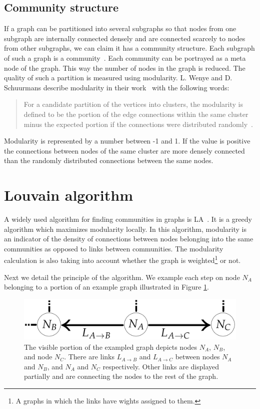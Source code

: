\subsection{Community structure} \label{communityStructure}
If a graph can be partitioned into several subgraphs so that nodes from one subgraph are internally connected densely and are connected scarcely to nodes from other subgraphs, we can claim it has a community structure. Each subgraph of such a graph is a community~\cite{communitiesOverview}. Each community can be portrayed as a meta node of the graph. This way the number of nodes in the graph is reduced. The quality of such a partition is measured using modularity. L. Wenye and D. Schuurmans describe modularity in their work~\cite{modularityOverview} with the following words: \begin{quotation}  For a candidate partition of the vertices into clusters, the modularity is defined to be the portion of the edge connections within the same cluster minus the expected portion if the connections were distributed randomly~\cite{modularityDefinition}. \end{quotation} Modularity is represented by a number between -1 and 1. If the value is positive the connections between nodes of the same cluster are more densely connected than the randomly distributed connections between the same nodes.

\section{Louvain algorithm} \label{louvainAlgorithm}
A widely used algorithm for finding communities in graphs is LA~\cite{louvainAlgorithm}. It is a greedy algorithm which maximizes modularity locally. In this algorithm, modularity is an indicator of the density of connections between nodes belonging into the same communities as opposed to links between communities. The modularity calculation is also taking into account whether the graph is weighted\footnote{A graphs in which the links have wights assigned to them.} or not.

Next we detail the principle of the algorithm. We example each step on node $N_{A}$ belonging to a portion of an example graph illustrated in Figure \ref{exampleGraphLouvain}.
\begin{figure}[ht!]
  \centering
  \includegraphics[width=\textwidth]{Images/graphForCommunity.png}
  \caption{The visible portion of the exampled graph depicts nodes $N_{A}$, $N_{B}$, and  node $N_{C}$. There are links  $L_{A\rightarrow B}$ and  $L_{A\rightarrow C}$  between nodes  $N_{A}$ and  $N_{B}$, and  $N_{A}$ and  $N_{C}$ respectively. Other links are displayed partially and are connecting the nodes to the rest of the graph.}
  \label{exampleGraphLouvain}
\end{figure} 

